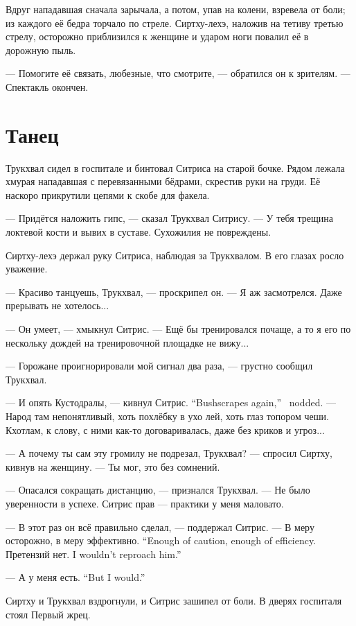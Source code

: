 Вдруг нападавшая сначала зарычала, а потом, упав на колени, взревела от боли;
из каждого её бедра торчало по стреле.
Сиртху-лехэ, наложив на тетиву третью стрелу, осторожно приблизился к женщине и ударом ноги повалил её в дорожную пыль.

--- Помогите её связать, любезные, что смотрите, --- обратился он к зрителям.
--- Спектакль окончен.

\section{Танец}

Трукхвал сидел в госпитале и бинтовал Ситриса на старой бочке.
Рядом лежала хмурая нападавшая с перевязанными бёдрами, скрестив руки на груди.
Её наскоро прикрутили цепями к скобе для факела.

--- Придётся наложить гипс, --- сказал Трукхвал Ситрису.
--- У тебя трещина локтевой кости и вывих в суставе.
Сухожилия не повреждены.

Сиртху-лехэ держал руку Ситриса, наблюдая за Трукхвалом.
В его глазах росло уважение.

--- Красиво танцуешь, Трукхвал, --- проскрипел он.
--- Я аж засмотрелся.
Даже прерывать не хотелось...

--- Он умеет, --- хмыкнул Ситрис.
--- Ещё бы тренировался почаще, а то я его по нескольку дождей на тренировочной площадке не вижу...

--- Горожане проигнорировали мой сигнал два раза, --- грустно сообщил Трукхвал.

{--- И опять Кустодралы, --- кивнул Ситрис.}
{``Bushscrapes again,'' \Sitris\ nodded.}
--- Народ там непонятливый, хоть похлёбку в ухо лей, хоть глаз топором чеши.
Кхотлам, к слову, с ними как-то договаривалась, даже без криков и угроз...

--- А почему ты сам эту громилу не подрезал, Трукхвал? --- спросил Сиртху, кивнув на женщину.
--- Ты мог, это без сомнений.

--- Опасался сокращать дистанцию, --- признался Трукхвал.
--- Не было уверенности в успехе.
Ситрис прав --- практики у меня маловато.

--- В этот раз он всё правильно сделал, --- поддержал Ситрис.
{--- В меру осторожно, в меру эффективно.}
{``Enough of caution, enough of efficiency.}
{Претензий нет.}
{I wouldn't reproach him.''}

{--- А у меня есть.}
{``But I would.''}

Сиртху и Трукхвал вздрогнули, и Ситрис зашипел от боли.
В дверях госпиталя стоял Первый жрец.

